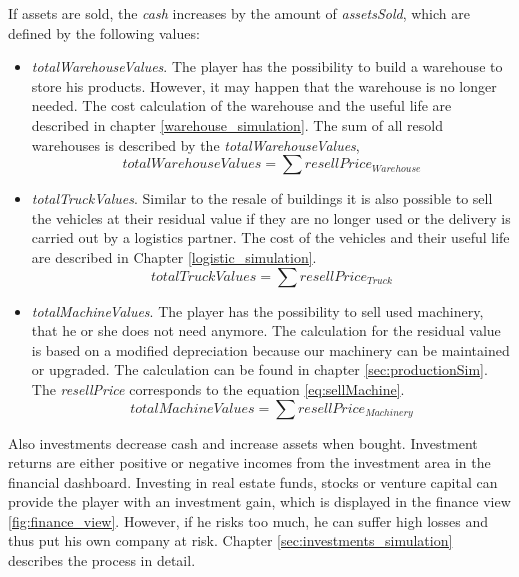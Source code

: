 If assets are sold, the \textit{cash} increases by the amount of \textit{assetsSold}, which are defined by the following values:
   
\begin{itemize}
    \item \textit{totalWarehouseValues}. The player has the possibility to build a warehouse to store his products. However, it may happen that the warehouse is no longer needed. 
    The cost calculation of the warehouse and the useful life are described in chapter \ref{warehouse_simulation}. The sum of all resold warehouses is described by the \textit{totalWarehouseValues}, 
    \begin{equation}
        totalWarehouseValues = \sum resellPrice_{Warehouse}
    \end{equation}
    \item \textit{totalTruckValues}. Similar to the resale of buildings it is also possible to sell the vehicles at their residual value if they are no longer used or the delivery is carried out by a logistics partner. The cost of the vehicles and their useful life are described in Chapter \ref{logistic_simulation}.
    \begin{equation}
        totalTruckValues = \sum resellPrice_{Truck}
    \end{equation}
    \item \textit{totalMachineValues}. The player has the possibility to sell used machinery, that he or she does not need anymore. The calculation for the residual value is based on a modified depreciation because our machinery can be maintained or upgraded. The calculation can be found in chapter \ref{sec:productionSim}. The \textit{resellPrice} corresponds to the equation \ref{eq:sellMachine}.
    \begin{equation}
        totalMachineValues = \sum resellPrice_{Machinery}
    \end{equation}
\end{itemize}

Also investments decrease cash and increase assets when bought. Investment returns are either positive or negative incomes from the investment area in the financial dashboard. Investing in real estate funds, stocks or venture capital can provide the player with an investment gain, which is displayed in the finance view \ref{fig:finance_view}. However, if he risks too much, he can suffer high losses and thus put his own company at risk. Chapter \ref{sec:investments_simulation} describes the process in detail.


